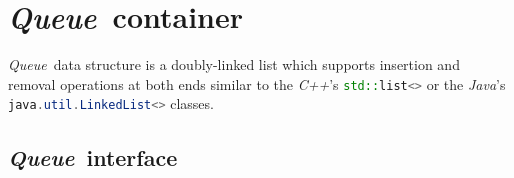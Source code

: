 \documentclass[a4paper]{article}
\newcommand{\Cpp}{\emph{C++}}
\newcommand{\Java}{\emph{Java}}
\begin{document}


\newcommand{\Queue}{\emph{Queue}}
\section{\Queue\ container}


\Queue\ data structure is a doubly-linked list which supports insertion and removal operations at both ends similar to the \Cpp's \lstinline[language=C++]{std::list<>} or the \Java's \lstinline[language=Java]{java.util.LinkedList<>} classes.


\subsection{\Queue\ interface}
\end{document}
